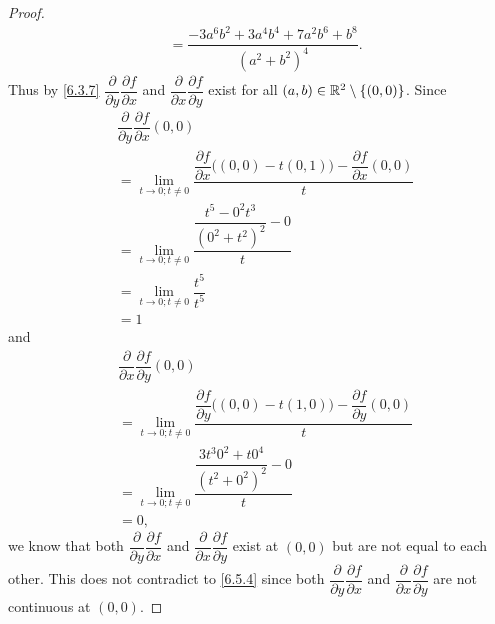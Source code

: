 \begin{proof}
\begin{align*}
     & = \dfrac{-3 a^6 b^2 + 3 a^4 b^4 + 7 a^2 b^6 + b^8}{(a^2 + b^2)^4}.
  \end{align*}
  Thus by \cref{6.3.7} \(\dfrac{\partial}{\partial y} \dfrac{\partial f}{\partial x}\) and \(\dfrac{\partial}{\partial x} \dfrac{\partial f}{\partial y}\) exist for all \((a, b) \in \mathbb{R}^2 \setminus \left\lbrace(0, 0)\right\rbrace\).
  Since
  \begin{align*}
     & \dfrac{\partial}{\partial y} \dfrac{\partial f}{\partial x}(0, 0)                                                                      \\
     & = \lim_{t \to 0 ; t \neq 0} \dfrac{\dfrac{\partial f}{\partial x}\big((0, 0) - t(0, 1)\big) - \dfrac{\partial f}{\partial x}(0, 0)}{t} \\
     & = \lim_{t \to 0 ; t \neq 0} \dfrac{\dfrac{t^5 - 0^2 t^3}{(0^2 + t^2)^2} - 0}{t}                                                        \\
     & = \lim_{t \to 0 ; t \neq 0} \dfrac{t^5}{t^5}                                                                                           \\
     & = 1
  \end{align*}
  and
  \begin{align*}
     & \dfrac{\partial}{\partial x} \dfrac{\partial f}{\partial y}(0, 0)                                                                      \\
     & = \lim_{t \to 0 ; t \neq 0} \dfrac{\dfrac{\partial f}{\partial y}\big((0, 0) - t(1, 0)\big) - \dfrac{\partial f}{\partial y}(0, 0)}{t} \\
     & = \lim_{t \to 0 ; t \neq 0} \dfrac{\dfrac{3 t^3 0^2 + t 0^4}{(t^2 + 0^2)^2} - 0}{t}                                                    \\
     & = 0,
  \end{align*}
  we know that both \(\dfrac{\partial}{\partial y} \dfrac{\partial f}{\partial x}\) and \(\dfrac{\partial}{\partial x} \dfrac{\partial f}{\partial y}\) exist at \((0, 0)\) but are not equal to each other.
  This does not contradict to \cref{6.5.4} since both \(\dfrac{\partial}{\partial y} \dfrac{\partial f}{\partial x}\) and \(\dfrac{\partial}{\partial x} \dfrac{\partial f}{\partial y}\) are not continuous at \((0, 0)\).
\end{proof}
